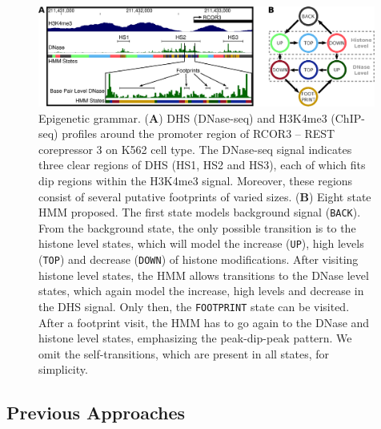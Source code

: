 \documentclass{bioinfo}
\begin{document}
\begin{figure}[t]
\centering
     \includegraphics[width=0.99\textwidth]{FootprintsHMM.eps}
\caption{Epigenetic grammar. (\textbf{A}) DHS (DNase-seq) and H3K4me3 (ChIP-seq) profiles around the promoter region of RCOR3 -- REST corepressor 3 on K562 cell type. The DNase-seq signal indicates three clear regions of DHS (HS1, HS2 and HS3), each of which fits dip regions within the H3K4me3 signal. Moreover, these regions consist of several putative footprints of varied sizes. (\textbf{B}) Eight state HMM proposed. The first state models background signal ({\tt BACK}). From the background state, the only possible transition is to the histone level states, which will model the increase ({\tt UP}), high levels ({\tt TOP}) and decrease ({\tt DOWN}) of histone modifications. After visiting histone level states, the HMM allows transitions to the DNase level states, which again model the increase, high levels and decrease in the DHS signal. Only then, the {\tt FOOTPRINT} state can be visited. After a footprint visit, the HMM has to go again to the DNase and histone level states, emphasizing the peak-dip-peak pattern. We omit the self-transitions, which are present in all states, for simplicity.}
\label{fig:hmm}
\end{figure}

\subsection{Previous Approaches}
\label{sec:previous.approaches}
\end{document}
